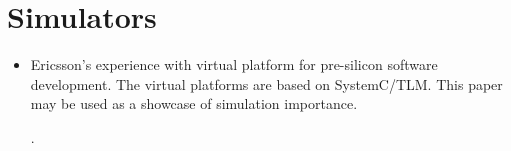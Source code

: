 



\section*{Simulators}

\begin{itemize}
    \item Ericsson's experience with virtual platform for pre-silicon software development. The virtual platforms are based on SystemC/TLM. This paper may be used as a showcase of simulation importance.

    \cite{Dahl:Ericsson-VP:2016}.
\end{itemize}


